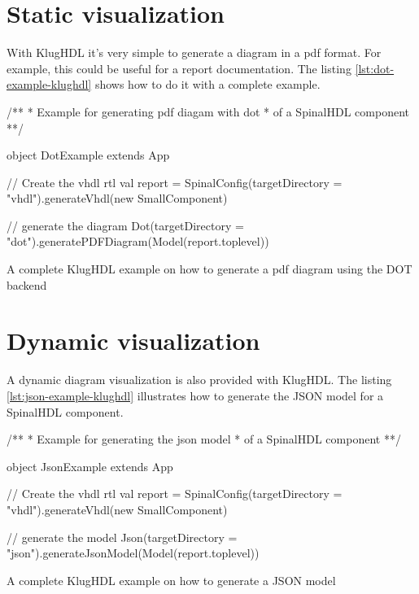 \section{Static visualization}
\label{sec:static-visualization}

With KlugHDL it's very simple to generate a diagram in a pdf format. For example, this could be
useful for a report documentation. The listing \ref{lst:dot-example-klughdl}
shows how to do it with a complete example.

\begin{listing}[H]
  \centering
  \begin{scalacode}
  /**
   * Example for generating pdf diagam with dot
   * of a SpinalHDL component
  **/
   
   object DotExample extends App {

    // Create the vhdl rtl
    val report = SpinalConfig(targetDirectory = "vhdl").generateVhdl(new SmallComponent)

    // generate the diagram
    Dot(targetDirectory = "dot").generatePDFDiagram(Model(report.toplevel))
  }
  \end{scalacode}
  \caption[KlugHDL example on how to generate a pdf diagram]{A complete KlugHDL
    example on how to generate a pdf diagram using the DOT backend}
  \label{lst:dot-example-klughdl}
\end{listing}

\section{Dynamic visualization}
\label{sec:dynamic-visualization}

A dynamic diagram visualization is also provided with KlugHDL. The listing
\ref{lst:json-example-klughdl} illustrates how to generate the JSON model for a
SpinalHDL component.

\begin{listing}[H]
  \centering
  \begin{scalacode}
  /**
   * Example for generating the json model
   * of a SpinalHDL component
   **/

   object JsonExample extends App {
     
     // Create the vhdl rtl
    val report = SpinalConfig(targetDirectory = "vhdl").generateVhdl(new SmallComponent)

     // generate the model
     Json(targetDirectory = "json").generateJsonModel(Model(report.toplevel))
   }
  \end{scalacode}
  \caption[KlugHDL example on how to generate a JSON model]{A complete KlugHDL
    example on how to generate a JSON model}
  \label{lst:json-example-klughdl}
\end{listing}

